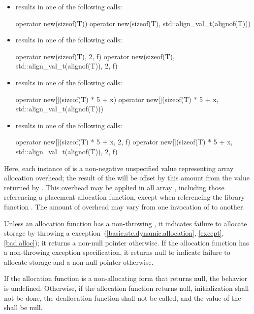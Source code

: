\pnum
\begin{example}
\begin{itemize}
\item {} results in one of the following calls:
\begin{codeblock}
operator new(sizeof(T))
operator new(sizeof(T), std::align_val_t(alignof(T)))
\end{codeblock}
\item {} results in one of the following calls:
\begin{codeblock}
operator new(sizeof(T), 2, f)
operator new(sizeof(T), std::align_val_t(alignof(T)), 2, f)
\end{codeblock}
\item {} results in one of the following calls:
\begin{codeblock}
operator new[](sizeof(T) * 5 + x)
operator new[](sizeof(T) * 5 + x, std::align_val_t(alignof(T)))
\end{codeblock}
\item {} results in one of the following calls:
\begin{codeblock}
operator new[](sizeof(T) * 5 + x, 2, f)
operator new[](sizeof(T) * 5 + x, std::align_val_t(alignof(T)), 2, f)
\end{codeblock}
\end{itemize}
Here, each instance of  is a non-negative unspecified value
representing array allocation overhead; the result of the
 will be offset by this amount from the value
returned by . This overhead may be applied in all
array , including those referencing
a placement allocation function, except when referencing
the library function .
The amount of overhead may vary from one
invocation of  to another.
\end{example}

\pnum
\begin{note}
Unless an allocation function has a non-throwing
,
it indicates failure to allocate storage by throwing a
%
%
 exception~(\ref{basic.stc.dynamic.allocation},
\ref{except}, \ref{bad.alloc});
it returns a non-null pointer otherwise. If the allocation function
has a non-throwing exception specification,
it returns null to indicate failure to allocate storage
and a non-null pointer otherwise.
\end{note}
If the allocation function is a non-allocating
form that returns null,
the behavior is undefined.
Otherwise,
if the allocation function returns null, initialization shall not be
done, the deallocation function shall not be called, and the value of
the  shall be null.

